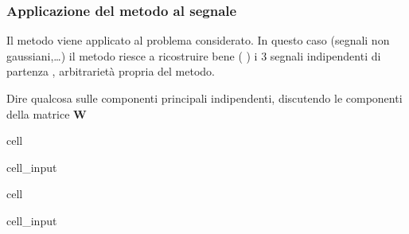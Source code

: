 \documentclass[letterpaper,10pt,italian]{jupyterBook}
\begin{document}
\subsubsection{Applicazione del metodo al segnale}
\label{\detokenize{ch/ai/ica-pca-details:applicazione-del-metodo-al-segnale}}
\sphinxAtStartPar
Il metodo viene applicato al problema considerato. In questo caso (segnali non gaussiani,…) il metodo riesce a ricostruire bene ( ) i 3 segnali indipendenti di partenza , arbitrarietà propria del metodo.

\sphinxAtStartPar
{} Dire qualcosa sulle componenti principali indipendenti, discutendo le componenti della matrice \(\mathbf{W}\)

\begin{sphinxuseclass}{cell}\begin{sphinxVerbatimInput}

\begin{sphinxuseclass}{cell_input}
\begin{sphinxVerbatim}[commandchars=\\\{\}]
   

   
\end{sphinxVerbatim}

\end{sphinxuseclass}\end{sphinxVerbatimInput}

\end{sphinxuseclass}
\begin{sphinxuseclass}{cell}\begin{sphinxVerbatimInput}

\begin{sphinxuseclass}{cell_input}
\begin{sphinxVerbatim}[commandchars=\\\{\}]
    

  
\end{sphinxVerbatim}

\end{sphinxuseclass}\end{sphinxVerbatimInput}

\end{sphinxuseclass}
\end{document}

